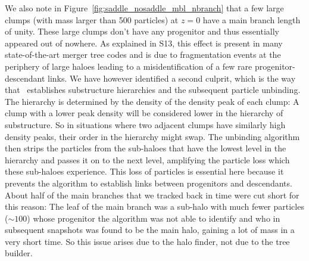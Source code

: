 We also note in Figure~\ref{fig:saddle_nosaddle_mbl_nbranch} that a few
large clumps (with mass larger than 500 particles) at $z=0$ have a
main branch length of unity.  These large clumps don't have any
progenitor and thus essentially appeared out of nowhere. As explained
in S13, this effect is present in many state-of-the-art merger tree
codes and is due to fragmentation events at the periphery of large
haloes leading to a misidentification of a few rare progenitor-descendant
links. We have however identified a second culprit, which is the way that
\phew\ establishes substructure hierarchies and the subsequent particle
unbinding. The hierarchy is determined by the density of the density peak
of each clump: A clump with a lower peak density will be considered lower
in the hierarchy of substructure. So in situations where two adjacent
clumps have similarly high density peaks, their order in the hierarchy
might swap. The unbinding algorithm then strips the particles from the
sub-haloes that have the lowest level in the hierarchy and passes it on to
the next level, amplifying the particle loss which these sub-haloes
experience. This loss of particles is essential here because it prevents
the algorithm to establish links between progenitors and descendants.
About half of the main branches that we tracked back in time were cut
short for this reason: The leaf of the main branch was a sub-halo with
much fewer particles ($\sim 100$) whose progenitor the algorithm was
not able to identify and who in subsequent snapshots was found to be
the main halo, gaining a lot of mass in a very short time. So this issue
arises due to the halo finder, not due to the tree builder.

